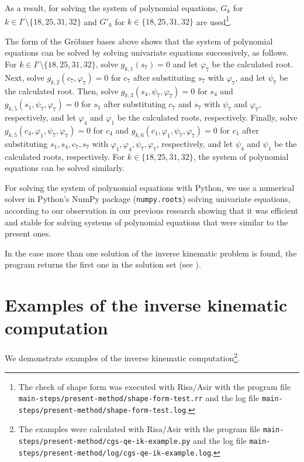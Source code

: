 \documentclass{birkjour}
\theoremstyle{plain}
\theoremstyle{definition}
\begin{document}
    As a result, for solving the system of polynomial equations,
    $G_k$ for $k\in I'\setminus\{18,25,31,32\}$ and 
    $G'_k$ for $k\in\{18,25,31,32\}$ are used\footnote{The check of shape form was 
    executed with Risa/Asir with the program file 
    \texttt{main-steps/present-method/shape-form-test.rr} and the log file
    \texttt{main-steps/present-method/shape-form-test.log}.}.

    The form of the Gr\"obner bases above shows that the system of polynomial
    equations can be solved by solving univariate equations successively, 
    as follows. 
    For $k\in I'\setminus\{18,25,31,32\}$, solve $g_{k,1}(s_7)=0$ and let $\varphi_7$ be 
    the calculated root. Next, solve $g_{k,2}(c_7,\varphi_7)=0$ for $c_7$ after 
    substituting $s_7$ with $\varphi_7$, and let $\psi_7$ be the calculated root.
    Then, solve $g_{k,3}(s_4,\psi_7,\varphi_7)=0$ for $s_4$ and
    $g_{k,5}(s_1,\psi_7,\varphi_7)=0$ for $s_1$
    after substituting $c_7$ and $s_7$ with $\psi_7$ and $\varphi_7$, respectively,
    and let $\varphi_4$ and $\varphi_1$ be the calculated roots, respectively.
    Finally, solve $g_{k,5}(c_4,\varphi_1,\psi_7,\varphi_7)=0$ for $c_4$ and 
    $g_{k,6}(c_1,\varphi_1,\psi_7,\varphi_7)=0$ for $c_1$ after
    substituting $s_1,s_4,c_7,s_7$ with $\varphi_1,\varphi_4,\psi_7,\varphi_7$, respectively,
    and let $\psi_4$ and $\psi_1$ be the calculated roots, respectively.
    For $k\in\{18,25,31,32\}$, the system of polynomial equations can be solved similarly.

    For solving the system of polynomial equations with Python, we use a numerical 
    solver in Python's NumPy package \cite{numpy2011} (\texttt{numpy.roots}) solving
    univariate equations, according to our observation in our previous research \cite{hor-ter-mik2020} showing that it was efficient and stable for solving systems of polynomial equations that were similar to the present ones.

    In the case more than one solution of the inverse kinematic problem is found,
    the program returns the first one in the solution set (see ).

    \section{Examples of the inverse kinematic computation}
    \label{sec:example}

    We demonstrate examples of the inverse kinematic computation\footnote{The examples were calculated with Risa/Asir with the program file \texttt{main-steps/present-method/cgs-qe-ik-example.py} and the log file \texttt{main-steps/present-method/log/cgs-qe-ik-example.log}.}.
\end{document}
